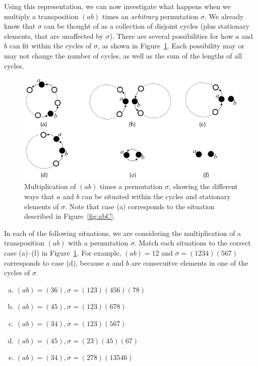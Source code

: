Using this representation, we can now investigate what happens when we multiply a transposition $(ab)$ times an \emph{arbitrary} permutation  $\sigma$. We already know that $\sigma$ can be thought of as a collection of disjoint cycles (plus stationary  elements, that are unaffected by $\sigma$). There are several possibilities for how $a$ and $b$ can fit within the cycles of $\sigma$, as shown in Figure~\ref{fig:abC2}.  Each possibility may or may not change the number of cycles, as well as the sum of the lengths of all cycles.   

\begin{figure}[!h]
\begin{center}
\includegraphics[width=5in]{images/abC2.png}
\caption{Multiplication of $(ab)$ times a permutation $\sigma$, showing the different ways that $a$ and $b$ can be situated within the cycles and stationary elements of  $\sigma$. Note that  case (a) corresponds to the situation described in Figure~\ref{fig:abC}. }\label{fig:abC2}
\end{center}
\end{figure}

\begin{exercise}{}
In each of the following situations, we are considering the multiplication of a transposition $(ab)$ with a permutation $\sigma$. Match each situations to the  correct case (a)--(f) in Figure~\ref{fig:abC2}. For example, $(ab)=12$ and $\sigma = (1234)(567)$ corresponds to case (d), because $a$ and $b$ are consecuitve elements in one of the cycles of $\sigma$.  
\begin{enumerate}[(a)]
\item
$(ab) = (36), \sigma = (123)(456)(78)$
\item
$(ab) = (45), \sigma = (123)(678)$
\item
$(ab) = (34), \sigma = (123) (567)$
\item
$(ab) = (45), \sigma = (23)(45)(67)$
\item
$(ab) = (34), \sigma = (278)(13546)$
\end{enumerate}
\end{exercise}


